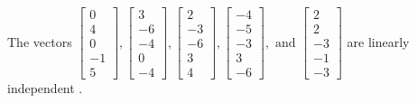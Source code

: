 \begin{exercise}
\begin{exerciseStatement}
  \end{exerciseStatement}
  \begin{exerciseAnswer}
   The vectors \(\left[\begin{array}{r}
0 \\
4 \\
0 \\
-1 \\
5
\end{array}\right] , \left[\begin{array}{r}
3 \\
-6 \\
-4 \\
0 \\
-4
\end{array}\right] , \left[\begin{array}{r}
2 \\
-3 \\
-6 \\
3 \\
4
\end{array}\right] , \left[\begin{array}{r}
-4 \\
-5 \\
-3 \\
3 \\
-6
\end{array}\right] , \text{ and } \left[\begin{array}{r}
2 \\
2 \\
-3 \\
-1 \\
-3
\end{array}\right]\) are 
  	 linearly independent  .
  


  \end{exerciseAnswer}
\end{exercise}